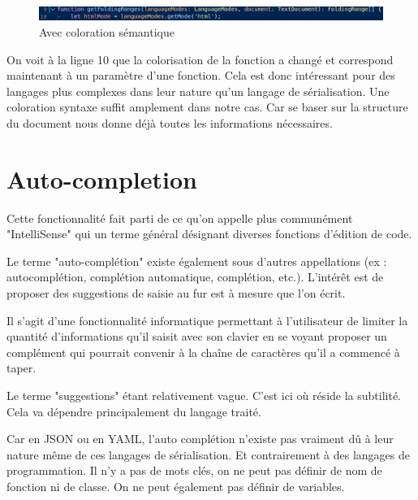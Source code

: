 \documentclass[
    iict, %
    il, %
]{heig-tb}
\begin{document}
\begin{figure}[!h]
    \begin{center}
        \includegraphics[width=15cm]{assets/figures/semantic-coloration-with.png}
    \end{center}
    \caption[Sans coloration sémantique ]{\label{semantic-coloration-with} Avec coloration sémantique }
\end{figure}

On voit à la ligne 10 que la colorisation de la fonction a changé et correspond maintenant à un paramètre d'une fonction.
Cela est donc intéressant pour des langages plus complexes dans leur nature qu'un langage de sérialisation. Une coloration syntaxe suffit amplement dans notre cas.
Car se baser sur la structure du document nous donne déjà toutes les informations nécessaires.

\section{Auto-completion}


Cette fonctionnalité fait parti de ce qu'on appelle plus communément "IntelliSense" \cite{intelliSense} qui un terme général désignant diverses fonctions d'édition de code.

Le terme "auto-complétion" existe également sous d'autres appellations (ex : autocomplétion, complétion automatique, complétion, etc.).
L'intérêt est de proposer des suggestions de saisie au fur est à mesure que l'on écrit.

Il s'agit d'une fonctionnalité informatique permettant à l'utilisateur de limiter la quantité d'informations qu'il saisit avec son clavier
en se voyant proposer un complément qui pourrait convenir à la chaîne de caractères qu'il a commencé à taper.

Le terme "suggestions" étant relativement vague. C'est ici où réside la subtilité. Cela va dépendre principalement du langage traité.

Car en JSON ou en YAML, l'auto complétion n'existe pas vraiment dû à leur nature même de ces langages de sérialisation.
Et contrairement à des langages de programmation. Il n'y a pas de mots clés, on ne peut pas définir de nom de fonction ni de classe.
On ne peut également pas définir de variables.
\end{document}
